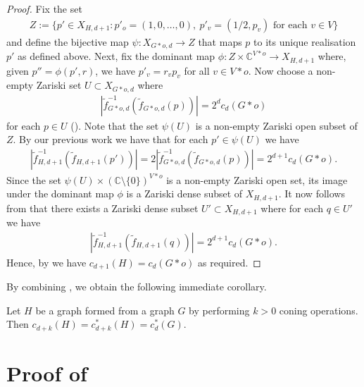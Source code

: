 \documentclass[ALCO]{cedram}
\begin{document}
\begin{proof}
	Fix the set
	\begin{align*}
		Z := \Big\{ p' \in X_{H,d+1} :	p'_o = (1,0,\ldots,0), ~ p'_v = (1/2,p_v) \text{ for each $v \in V$}  \Big\}
	\end{align*}		
	and define the bijective map $\psi : X_{G*o,d} \rightarrow Z$ that maps $p$ to its unique realisation $p'$ as defined above.
	Next,
	fix the dominant map $\phi : Z \times \mathbb{C}^{V*o} \rightarrow X_{H,d+1}$ where,
	given $p'' = \phi(p',r)$, we have $p'_v = r_v p_v$ for all $v \in V *o$.
	Now choose a non-empty Zariski set $U \subset X_{G*o,d}$ where 
	\begin{align*}
		|\tilde{f}_{G*o,d}^{-1}(\tilde{f}_{G*o,d}(p))| = 2^{d}c_d(G*o)
	\end{align*}
	for each $p \in U$ ().
	Note that the set $\psi(U)$ is a non-empty Zariski open subset of $Z$.
	By our previous work we have that for each $p' \in \psi(U)$ we have
	\begin{align*}
		|\tilde{f}_{H,d+1}^{-1}(\tilde{f}_{H,d+1}(p'))| = 2|\tilde{f}_{G*o,d}^{-1}(\tilde{f}_{G*o,d}(p))| = 2^{d+1} c_d(G*o).
	\end{align*}
	Since the set $\psi(U) \times (\mathbb{C} \setminus \{0\})^{V*o}$ is a non-empty Zariski open set,
	its image under the dominant map $\phi$ is a Zariski dense subset of $X_{H,d+1}$.
	It now follows from  that there exists a Zariski dense subset $U' \subset X_{H,d+1}$ where for each $q \in U'$ we have
	\begin{align*}
		 |\tilde{f}_{H,d+1}^{-1}(\tilde{f}_{H,d+1}(q))| = 2^{d+1} c_d(G*o).
	\end{align*}
	Hence, by  we have $c_{d+1}(H) = c_d(G*o)$ as required.
\end{proof}

By combining ,
we obtain the following immediate corollary.


\begin{corollary}\label{cor:conecount2}
	Let $H$ be a graph formed from a graph $G$ by performing $k>0$ coning operations.
Then $c_{d+k}(H) = c_{d+k}^*(H) = c_d^*(G)$.
\end{corollary}








\section{Proof of \texorpdfstring{}{Theorem 1.1}}\label{sec:flat}
\end{document}
